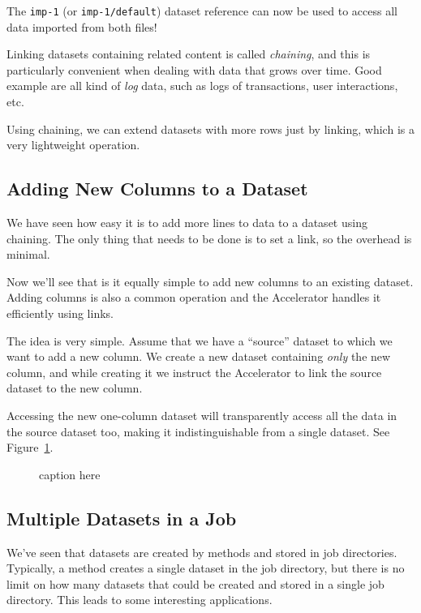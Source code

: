 \noindent The \texttt{imp-1} (or \texttt{imp-1/default}) dataset
reference can now be used to access all data imported from both files!

Linking datasets containing related content is called \emph{chaining},
and this is particularly convenient when dealing with data that grows
over time.  Good example are all kind of \emph{log} data, such as logs
of transactions, user interactions, etc.

Using chaining, we can extend datasets with more rows just by linking,
which is a very lightweight operation.



\subsection{Adding New Columns to a Dataset}
We have seen how easy it is to add more lines to data to a dataset
using chaining.  The only thing that needs to be done is to set a
link, so the overhead is minimal.

Now we'll see that is it equally simple to add new columns to an
existing dataset.  Adding columns is also a common operation and the
Accelerator handles it efficiently using links.

The idea is very simple.  Assume that we have a ``source'' dataset to
which we want to add a new column.  We create a new dataset containing
\textsl{only} the new column, and while creating it we instruct the
Accelerator to link the source dataset to the new column.

Accessing the new one-column dataset will transparently access all the
data in the source dataset too, making it indistinguishable from a
single dataset.  See Figure~\ref{fig:dep_dataset_append_column}.

\begin{figure}[h!]
  \begin{center}
    
    \caption{caption here}
    \label{fig:dep_dataset_append_column}
  \end{center}
\end{figure}





\subsection{Multiple Datasets in a Job}

We've seen that datasets are created by methods and stored in job
directories.  Typically, a method creates a single dataset in the job
directory, but there is no limit on how many datasets that could be
created and stored in a single job directory.  This leads to some
interesting applications.


